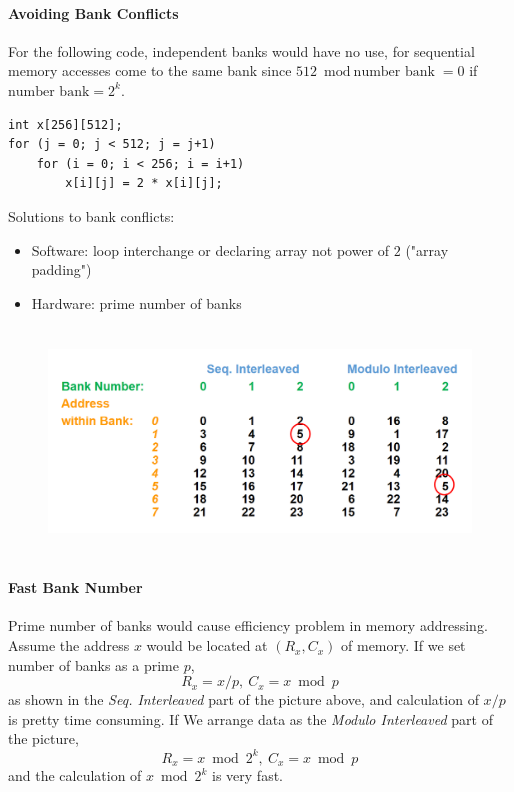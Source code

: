 \documentclass[12pt, a4paper]{article}
\theoremstyle{margin}
\begin{document}
				\paragraph{Avoiding Bank Conflicts} For the following code, independent banks would have no use, for sequential memory accesses come to the same bank since $512\bmod\text{number bank}=0$ if $\text{number bank}=2^k$.
\begin{lstlisting}
int x[256][512];
for (j = 0; j < 512; j = j+1)
    for (i = 0; i < 256; i = i+1)
        x[i][j] = 2 * x[i][j];
\end{lstlisting}
				Solutions to bank conflicts:
				\begin{itemize}
					\item Software: loop interchange or declaring array not power of $2$ ("array padding")
					\item Hardware: prime number of banks
				\end{itemize}
				\begin{figure}[H]
					\begin{center}
					  \includegraphics[height=6cm]{images/address-within-bank.png}
					\end{center}
			  \end{figure}
			  \paragraph{Fast Bank Number} Prime number of banks would cause efficiency problem in memory addressing. Assume the address $x$ would be located at $(R_x, C_x)$ of memory. If we set number of banks as a prime $p$,
			  \[R_x = x / p,\ C_x = x \bmod p\]
			  as shown in the \emph{Seq. Interleaved} part of the picture above, and calculation of $x / p$ is pretty time consuming.
				If We arrange data as the \emph{Modulo Interleaved} part of the picture,
				\[R_x = x \bmod 2^k,\ C_x = x \bmod p\]
				and the calculation of $x \bmod 2^k$ is very fast.
\end{document}
